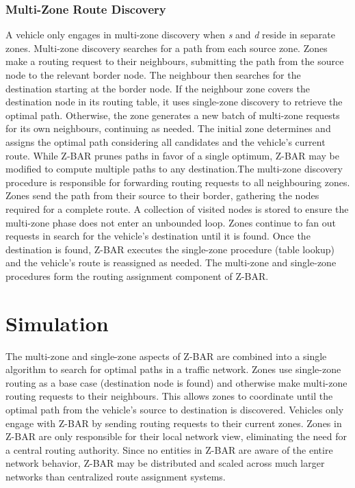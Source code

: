 \documentclass[12pt,conference]{IEEEtran}
\begin{document}
\subsubsection{Multi-Zone Route Discovery}

A vehicle only engages in multi-zone discovery when \textit{s} and \textit{d} reside in separate zones. Multi-zone discovery searches for a path from each source zone. Zones make a routing request to their neighbours, submitting the path from the source node to the relevant border node. The neighbour then searches for the destination starting at the border node. If the neighbour zone covers the destination node in its routing table, it uses single-zone discovery to retrieve the optimal path. Otherwise, the zone generates a new batch of multi-zone requests for its own neighbours, continuing as needed. The initial zone determines and assigns the optimal path considering all candidates and the vehicle's current route. While Z-BAR prunes paths in favor of a single optimum, Z-BAR may be modified to compute multiple paths to any destination.The multi-zone discovery procedure is responsible for forwarding routing requests to all neighbouring zones. Zones send the path from their source to their border, gathering the nodes required for a complete route. A collection of visited nodes is stored to ensure the multi-zone phase does not enter an unbounded loop. Zones continue to fan out requests in search for the vehicle's destination until it is found. Once the destination is found, Z-BAR executes the single-zone procedure (table lookup) and the vehicle's route is reassigned as needed. The multi-zone and single-zone procedures form the routing assignment component of Z-BAR.

\section{Simulation}

The multi-zone and single-zone aspects of Z-BAR are combined into a single algorithm to search for optimal paths in a traffic network. Zones use single-zone routing as a base case (destination node is found) and otherwise make multi-zone routing requests to their neighbours. This allows zones to coordinate until the optimal path from the vehicle's source to destination is discovered. Vehicles only engage with Z-BAR by sending routing requests to their current zones. Zones in Z-BAR are only responsible for their local network view, eliminating the need for a central routing authority. Since no entities in Z-BAR are aware of the entire network behavior, Z-BAR may be distributed and scaled across much larger networks than centralized route assignment systems.
\end{document}
